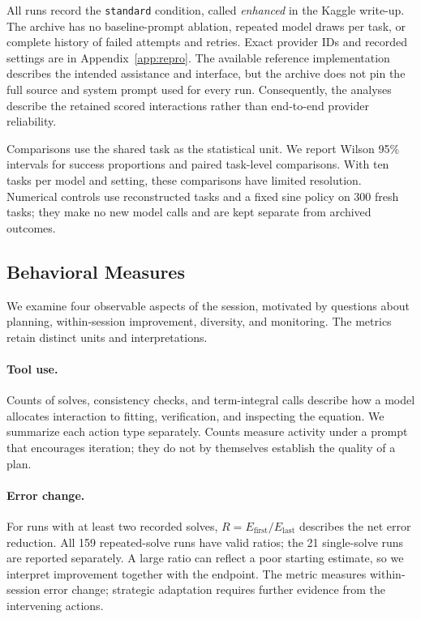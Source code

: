 \documentclass{article}
\begin{document}
All runs record the \texttt{standard} condition, called \emph{enhanced} in the
Kaggle write-up. The archive has no baseline-prompt ablation, repeated model draws
per task, or complete history of failed attempts and retries. Exact provider
IDs and recorded settings are in Appendix~\ref{app:repro}. The available
reference implementation describes the intended assistance and interface, but
the archive does not pin the full source and system prompt used for every run.
Consequently, the analyses describe the retained scored interactions rather
than end-to-end provider reliability.

Comparisons use the shared task as the statistical unit. We report Wilson 95\%
intervals for success proportions and paired task-level comparisons. With ten
tasks per model and setting, these comparisons have limited resolution.
Numerical controls use reconstructed tasks and a fixed sine policy on 300 fresh
tasks; they make no new model calls and are kept separate from archived outcomes.

\subsection{Behavioral Measures}

We examine four observable aspects of the session, motivated by questions about
planning, within-session improvement, diversity, and monitoring. The metrics
retain distinct units and interpretations.

\paragraph{Tool use.}
Counts of solves, consistency checks, and term-integral calls describe how a
model allocates interaction to fitting, verification, and inspecting the equation.
We summarize each action type separately. Counts measure activity under a prompt
that encourages iteration; they do not by themselves establish the quality of a
plan.

\paragraph{Error change.}
For runs with at least two recorded solves,
\(R=E_{\mathrm{first}}/E_{\mathrm{last}}\) describes the net error reduction.
All 159 repeated-solve runs have valid ratios; the 21 single-solve runs are
reported separately. A large ratio can reflect a poor starting estimate, so
we interpret improvement together with the endpoint. The metric measures
within-session error change; strategic adaptation requires further evidence
from the intervening actions.
\end{document}
